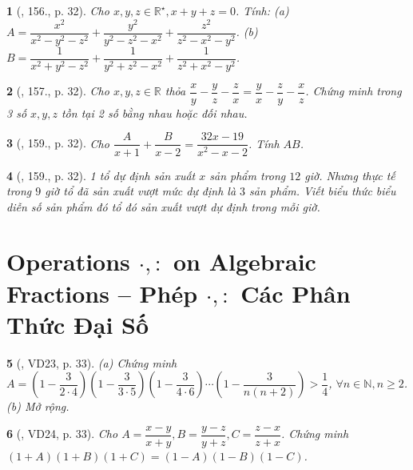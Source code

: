 \documentclass{article}
\newtheorem{baitoan}{}
\begin{document}
\begin{baitoan}[\cite{Tuyen_Toan_8}, 156., p. 32]
	Cho $x,y,z\in\mathbb{R}^\star,x + y + z = 0$. Tính: (a) $A = \dfrac{x^2}{x^2 - y^2 - z^2} + \dfrac{y^2}{y^2 - z^2 - x^2} + \dfrac{z^2}{z^2 - x^2 - y^2}$. (b) $B = \dfrac{1}{x^2 + y^2 - z^2} + \dfrac{1}{y^2 + z^2 - x^2} + \dfrac{1}{z^2 + x^2 - y^2}$.
\end{baitoan}

\begin{baitoan}[\cite{Tuyen_Toan_8}, 157., p. 32]
	Cho $x,y,z\in\mathbb{R}$ thỏa $\dfrac{x}{y} - \dfrac{y}{z} - \dfrac{z}{x} = \dfrac{y}{x} - \dfrac{z}{y} - \dfrac{x}{z}$. Chứng minh trong 3 số $x,y,z$ tồn tại 2 số bằng nhau hoặc đối nhau.
\end{baitoan}

\begin{baitoan}[\cite{Tuyen_Toan_8}, 159., p. 32]
	Cho $\dfrac{A}{x + 1} + \dfrac{B}{x - 2} = \dfrac{32x - 19}{x^2 - x - 2}$. Tính $AB$.
\end{baitoan}

\begin{baitoan}[\cite{Tuyen_Toan_8}, 159., p. 32]
	1 tổ dự định sản xuất $x$ sản phẩm trong $12$ giờ. Nhưng thực tế trong $9$ giờ tổ đã sản xuất vượt mức dự định là $3$ sản phẩm. Viết biểu thức biểu diễn số sản phẩm đó tổ đó sản xuất vượt dự định trong mỗi giờ.
\end{baitoan}


\section{Operations $\cdot,:$ on Algebraic Fractions -- Phép $\cdot,:$ Các Phân Thức Đại Số}

\begin{baitoan}[\cite{Tuyen_Toan_8}, VD23, p. 33]
	(a) Chứng minh $A = \left(1 - \dfrac{3}{2\cdot4}\right)\left(1 - \dfrac{3}{3\cdot5}\right)\left(1 - \dfrac{3}{4\cdot6}\right)\cdots\left(1 - \dfrac{3}{n(n + 2)}\right) > \dfrac{1}{4}$, $\forall n\in\mathbb{N},n\ge2$. (b) Mở rộng.
\end{baitoan}

\begin{baitoan}[\cite{Tuyen_Toan_8}, VD24, p. 33]
	Cho $A = \dfrac{x - y}{x + y},B = \dfrac{y - z}{y + z},C = \dfrac{z - x}{z + x}$. Chứng minh $(1 + A)(1 + B)(1 + C) = (1 - A)(1 - B)(1 - C)$.
\end{baitoan}
\end{document}
